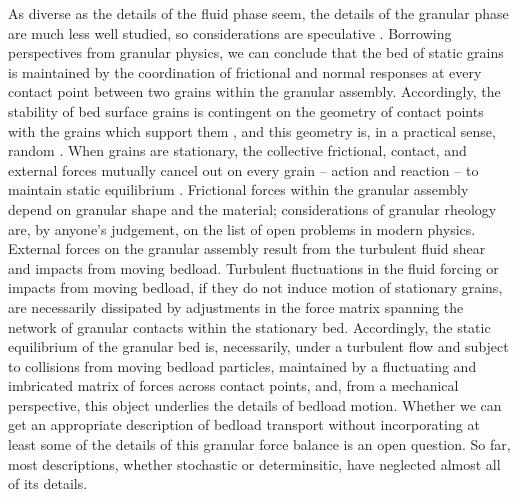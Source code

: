 \documentclass{article}
\begin{document}
{As diverse as the details of the fluid phase seem, the details of the granular phase are much less well studied, so considerations are speculative \citep{Frey2011}. 
Borrowing perspectives from granular physics, we can conclude that the bed of static grains is maintained by the coordination of frictional and normal responses at every contact point between two grains within the granular assembly. 
Accordingly, the stability of bed surface grains is contingent on the geometry of contact points with the grains which support them \citep{Coleman1967, Paintal1971}, and this geometry is, in a practical sense, random \citep{Bennett1972}. 
When grains are stationary, the collective frictional, contact, and external forces mutually cancel out on every grain -- action and reaction -- to maintain static equilibrium  \citep{Cundall1979}. 
Frictional forces within the granular assembly depend on granular shape and the material; considerations of granular rheology are, by anyone's judgement, on the list of open problems in modern physics. 
External forces on the granular assembly result from the turbulent fluid shear and impacts from moving bedload. 
Turbulent fluctuations in the fluid forcing or impacts from moving bedload, if they do not induce motion of stationary grains, are necessarily dissipated by adjustments in the force matrix spanning the network of granular contacts within the stationary bed. 
Accordingly, the static equilibrium of the granular bed is, necessarily, under a turbulent flow and subject to collisions from moving bedload particles, maintained by a fluctuating and imbricated matrix of forces across contact points, and, from a mechanical perspective, this object underlies the details of bedload motion.
Whether we can get an appropriate description of bedload transport without incorporating at least some of the details of this granular force balance is an open question. 
So far, most descriptions, whether stochastic or determinsitic, have neglected almost all of its details. 

}
\end{document}
